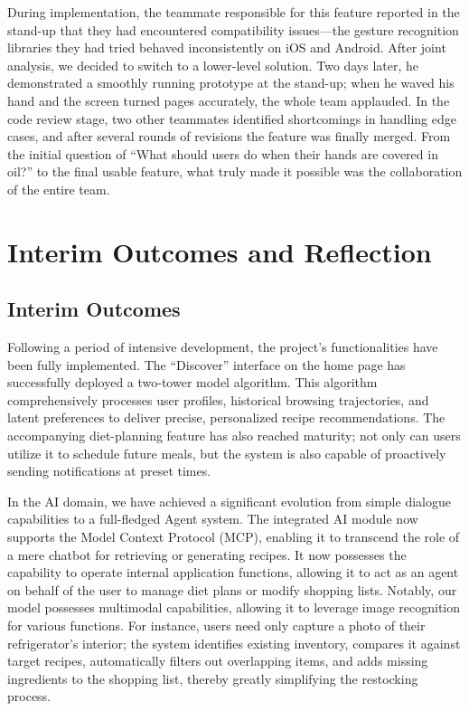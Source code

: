 \documentclass[sigconf]{acmart}
\begin{document}
During implementation, the teammate responsible for this feature reported in the stand-up that they had encountered compatibility issues---the gesture recognition libraries they had tried behaved inconsistently on iOS and Android. After joint analysis, we decided to switch to a lower-level solution. Two days later, he demonstrated a smoothly running prototype at the stand-up; when he waved his hand and the screen turned pages accurately, the whole team applauded. In the code review stage, two other teammates identified shortcomings in handling edge cases, and after several rounds of revisions the feature was finally merged. From the initial question of ``What should users do when their hands are covered in oil?'' to the final usable feature, what truly made it possible was the collaboration of the entire team.

\section{Interim Outcomes and Reflection}

\subsection{Interim Outcomes}

Following a period of intensive development, the project's functionalities have been fully implemented. The ``Discover'' interface on the home page has successfully deployed a two-tower model algorithm. This algorithm comprehensively processes user profiles, historical browsing trajectories, and latent preferences to deliver precise, personalized recipe recommendations. The accompanying diet-planning feature has also reached maturity; not only can users utilize it to schedule future meals, but the system is also capable of proactively sending notifications at preset times.

In the AI domain, we have achieved a significant evolution from simple dialogue capabilities to a full-fledged Agent system. The integrated AI module now supports the Model Context Protocol (MCP), enabling it to transcend the role of a mere chatbot for retrieving or generating recipes. It now possesses the capability to operate internal application functions, allowing it to act as an agent on behalf of the user to manage diet plans or modify shopping lists. Notably, our model possesses multimodal capabilities, allowing it to leverage image recognition for various functions. For instance, users need only capture a photo of their refrigerator's interior; the system identifies existing inventory, compares it against target recipes, automatically filters out overlapping items, and adds missing ingredients to the shopping list, thereby greatly simplifying the restocking process.
\end{document}
